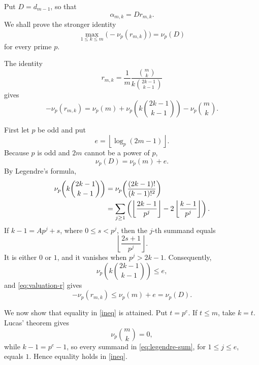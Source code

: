 \documentclass[14pt,dvipsnames]{extarticle}
\makeatletter
\numberwithin{equation}{subsection}
\theoremstyle{plain}
\theoremstyle{definition}
\theoremstyle{definition}
\renewenvironment{proof}[1][\proofname]{
 \par\pushQED{\qed}\normalfont
 \topsep6\p@\@plus6\p@\relax
 \trivlist\item[\hskip\labelsep\bfseries\itshape #1\@addpunct{.}]
}{\popQED\endtrivlist\@endpefalse}
\newcommand{\vp}{\nu_p}
\makeatother
\begin{document}
\begin{proof}
Put \(D=d_{m-1}\), so that
\[
\alpha_{m,k}=Dr_{m,k}.
\]
We shall prove the stronger identity
\begin{equation}\label{eq:max-valuation}
\max_{1\leq k\leq m}\bigl(-\vp(r_{m,k})\bigr)=\vp(D)
\end{equation}
for every prime \(p\).

The identity
\begin{equation}\label{eq:r-simplified}
r_{m,k}
=
\frac{1}{m}
\frac{\binom{m}{k}}
{k\binom{2k-1}{k-1}}
\end{equation}
gives
\begin{equation}\label{eq:valuation-r}
-\vp(r_{m,k})
=
\vp(m)
+
\vp\!\left(k\binom{2k-1}{k-1}\right)
-
\vp\binom{m}{k}.
\end{equation}

First let \(p\) be odd and put
\[
e=\left\lfloor\log_p(2m-1)\right\rfloor.
\]
Because $p$ is odd and $2m$ cannot be a power of $p$,
\begin{equation}\label{eq:odd-D}
\vp(D)=\vp(m)+e.
\end{equation}
By Legendre's formula,
\begin{align}
\vp\!\left(k\binom{2k-1}{k-1}\right)
&=
\vp\!\left(\frac{(2k-1)!}{(k-1)!^2}\right)\notag\\
&=
\sum_{j\geq1}
\left(
\left\lfloor\frac{2k-1}{p^j}\right\rfloor
-
2\left\lfloor\frac{k-1}{p^j}\right\rfloor
\right).
\label{eq:legendre-sum}
\end{align}
If \(k-1=Ap^j+s\), where \(0\leq s<p^j\), then the \(j\)-th
summand equals
\[
\left\lfloor\frac{2s+1}{p^j}\right\rfloor.
\]
It is either \(0\) or \(1\), and it vanishes when \(p^j>2k-1\).
Consequently,
\[
\vp\!\left(k\binom{2k-1}{k-1}\right)\leq e,
\]
and \eqref{eq:valuation-r} gives
\begin{equation}\label{ineq}
-\vp(r_{m,k})\leq\vp(m)+e=\vp(D).
\end{equation}

We now show that equality in \eqref{ineq} is attained. Put \(t=p^e\).
If \(t\leq m\), take \(k=t\). Lucas' theorem gives
\[
\vp\binom{m}{k}=0,
\]
while \(k-1=p^e-1\), so every summand in
\eqref{eq:legendre-sum}, for \(1\leq j\leq e\), equals \(1\).
Hence equality holds in \eqref{ineq}.


\end{proof}
\end{document}
